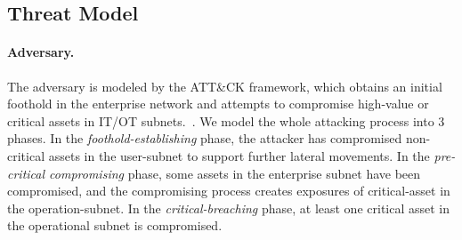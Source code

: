 \documentclass[sigconf,review,anonymous]{acmart}
\begin{document}
\subsection{Threat Model}
\label{subsec:threat-model}

\paragraph{Adversary.}
The adversary is modeled by the ATT\&CK framework, which obtains an initial foothold in the enterprise network and attempts to compromise high-value or critical assets in IT/OT subnets.~\cite{vyas2023automated,palmer2023drlsurvey}.
We model the whole attacking process into 3 phases. 
In the \emph{foothold-establishing} phase, the attacker has compromised non-critical assets in the user-subnet to support further lateral movements.
In the \emph{pre-critical compromising} phase, some assets in the enterprise subnet have been compromised, and the compromising process creates exposures of critical-asset in the operation-subnet.
In the \emph{critical-breaching} phase, at least one critical asset in the operational subnet is compromised.

\end{document}

